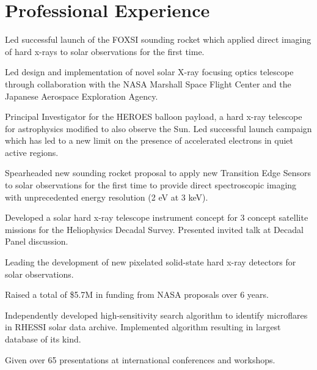 \documentclass[11pt]{article}
\begin{document}
\section{Professional Experience}
\begin{itemize*}
 \item Led successful launch of the FOXSI sounding rocket which applied direct imaging of hard x-rays to solar observations for the first time.
  \item Led design and implementation of novel solar X-ray focusing optics telescope through collaboration with the NASA Marshall Space Flight Center and the Japanese Aerospace Exploration Agency.
  \item Principal Investigator for the HEROES balloon payload, a hard x-ray telescope for astrophysics modified to also observe the Sun. Led successful launch campaign which has led to a new limit on the presence of accelerated electrons in quiet active regions.
  \item Spearheaded new sounding rocket proposal to apply new Transition Edge Sensors to solar observations for the first time to provide direct spectroscopic imaging with unprecedented energy resolution (2 eV at 3 keV).
  \item Developed a solar hard x-ray telescope instrument concept for 3 concept satellite missions for the Heliophysics Decadal Survey. Presented invited talk at Decadal Panel discussion.
  \item Leading the development of new pixelated solid-state hard x-ray detectors for solar observations.
 \item Raised a total of \$5.7M in funding from NASA proposals over 6 years.
 \item Independently developed high-sensitivity search algorithm to identify microflares in RHESSI solar
data archive. Implemented algorithm resulting in largest database of its kind.
 \item Given over 65 presentations at international conferences and workshops.
\end{itemize*} 
\end{document}
